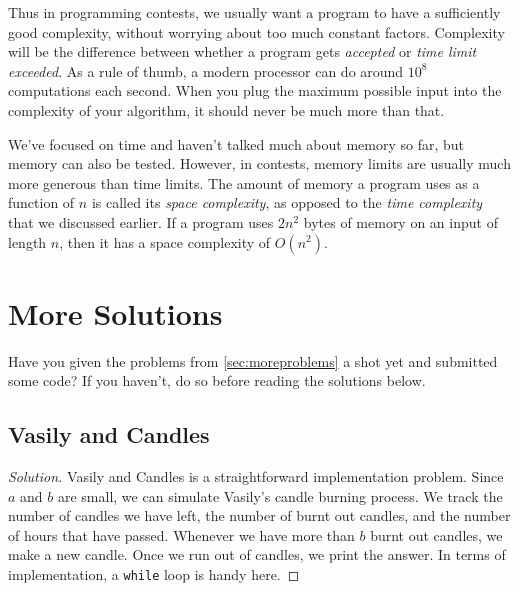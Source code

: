 Thus in programming contests, we usually want a program to have a sufficiently good complexity, without worrying about too much constant factors. Complexity will be the difference between whether a program gets \emph{\color{green}accepted} or \emph{\color{red}time limit exceeded}. As a rule of thumb, a modern processor can do around $10^8$ computations each second. When you plug the maximum possible input into the complexity of your algorithm, it should never be much more than that.

We've focused on time and haven't talked much about memory so far, but memory can also be tested. However, in contests, memory limits are usually much more generous than time limits. The amount of memory a program uses as a function of $n$ is called its \emph{space complexity}, as opposed to the \emph{time complexity} that we discussed earlier. If a program uses $2n^2$ bytes of memory on an input of length $n$, then it has a space complexity of $O(n^2)$.

\section{More Solutions}


Have you given the problems from \ref{sec:moreproblems} a shot yet and submitted some code? If you haven't, do so before reading the solutions below.

\subsection{Vasily and Candles}

\begin{proof}[Solution]
  Vasily and Candles is a straightforward implementation problem. Since $a$ and $b$ are small, we can simulate Vasily's candle burning process. We track the number of candles we have left, the number of burnt out candles, and the number of hours that have passed. Whenever we have more than $b$ burnt out candles, we make a new candle. Once we run out of candles, we print the answer. In terms of implementation, a \texttt{while} loop is handy here.
\end{proof}

